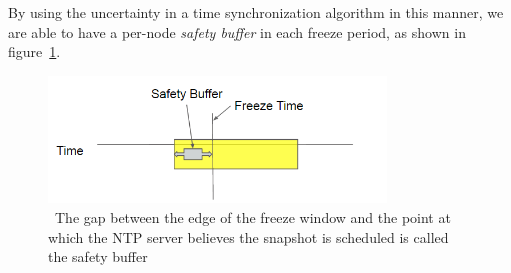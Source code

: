 By using the uncertainty in a time synchronization algorithm in this
manner, we are able to have a per-node \textit{safety buffer} in each
freeze period, as shown in figure~\ref{fig:safety-buff}.

\begin{figure}
\includegraphics[width=0.8\textwidth]{safety-diagram.png}
\caption{~The gap between the edge of the freeze window and the point at which the NTP server believes the snapshot is scheduled is called the safety buffer}
\label{fig:safety-buff}
\end{figure}

